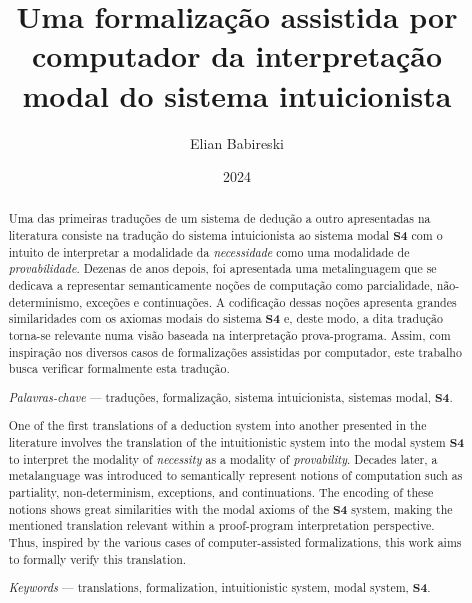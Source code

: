 


    \title{Uma formalização assistida por computador da interpretação modal do sistema intuicionista}
    \author{Elian Babireski}
    \date{2024}

    \maketitle

    \begin{abstract}
        Uma das primeiras traduções de um sistema de dedução a outro apresentadas na literatura consiste na tradução do sistema intuicionista ao sistema modal $\mathbf{S4}$ com o intuito de interpretar a modalidade da \emph{necessidade} como uma modalidade de \emph{provabilidade}. Dezenas de anos depois, foi apresentada uma metalinguagem que se dedicava a representar semanticamente noções de computação como parcialidade, não-determinismo, exceções e continuações. A codificação dessas noções apresenta grandes similaridades com os axiomas modais do sistema $\mathbf{S4}$ e, deste modo, a dita tradução torna-se relevante numa visão baseada na interpretação prova-programa. Assim, com inspiração nos diversos casos de formalizações assistidas por computador, este trabalho busca verificar formalmente esta tradução.

        \textit{Palavras-chave} --- traduções, formalização, sistema intuicionista, sistemas modal, $\mathbf{S4}$.
    \end{abstract}

    \begin{otherlanguage}{english} 
        \begin{abstract}
            One of the first translations of a deduction system into another presented in the literature involves the translation of the intuitionistic system into the modal system $\mathbf{S4}$ to interpret the modality of \emph{necessity} as a modality of \emph{provability}. Decades later, a metalanguage was introduced to semantically represent notions of computation such as partiality, non-determinism, exceptions, and continuations. The encoding of these notions shows great similarities with the modal axioms of the $\mathbf{S4}$ system, making the mentioned translation relevant within a proof-program interpretation perspective. Thus, inspired by the various cases of computer-assisted formalizations, this work aims to formally verify this translation.

            \textit{Keywords} --- translations, formalization, intuitionistic system, modal system, $\mathbf{S4}$.
        \end{abstract}
    \end{otherlanguage}

